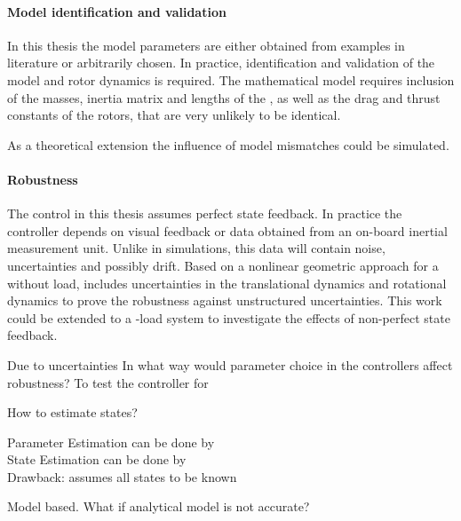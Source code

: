 \paragraph{Model identification and validation}
In this thesis the model parameters are either obtained from examples in literature or arbitrarily chosen. In practice, identification and validation of the  model and rotor dynamics is required.
The mathematical model requires inclusion of the masses, inertia matrix and lengths of the , as well as the drag and thrust constants of the rotors, that are very unlikely to be identical.

As a theoretical extension the influence of model mismatches could be simulated.

\paragraph{Robustness}
The control in this thesis assumes perfect state feedback. In practice the controller depends on visual feedback or data obtained from an on-board inertial measurement unit. Unlike in simulations, this data will contain noise, uncertainties and possibly drift. 
Based on a nonlinear geometric approach for a  without load, \cite{Goodarzi2013a} includes uncertainties in the translational dynamics and rotational dynamics to prove the robustness against unstructured uncertainties. This work could be extended to a -load system to investigate the effects of non-perfect state feedback. 

Due to uncertainties
In what way would parameter choice in the controllers affect robustness?
To test the controller for


How to estimate states?

Parameter Estimation can be done by\\

State Estimation can be done by\\

Drawback: assumes all states to be known

Model based. What if analytical model is not accurate?

